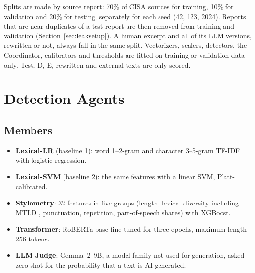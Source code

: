 \documentclass[journal]{IEEEtran}
\begin{document}
Splits are made by source report: 70\% of CISA sources for training, 10\% for validation and 20\% for testing,
separately for each seed (42, 123, 2024). Reports that are near-duplicates of a test report are then removed from
training and validation (Section~\ref{sec:leaksetup}). A human excerpt and all of its LLM versions, rewritten or
not, always fall in the same split. Vectorizers, scalers, detectors, the Coordinator, calibrators and thresholds are
fitted on training or validation data only. Test, D, E, rewritten and external texts are only scored.

\section{Detection Agents}\label{sec:agents}
\subsection{Members}
\begin{itemize}
\item \textbf{Lexical-LR} (baseline 1): word 1--2-gram and character 3--5-gram TF-IDF with logistic regression.
\item \textbf{Lexical-SVM} (baseline 2): the same features with a linear SVM, Platt-calibrated.
\item \textbf{Stylometry}: 32 features in five groups (length, lexical diversity including MTLD \cite{McCarthy_2010},
punctuation, repetition, part-of-speech shares) with XGBoost.
\item \textbf{Transformer}: RoBERTa-base \cite{Liu_2019} fine-tuned for three epochs, maximum length 256 tokens.
\item \textbf{LLM Judge}: Gemma~2~9B, a model family not used for generation, asked zero-shot for the probability
that a text is AI-generated.
\end{itemize}
\end{document}
